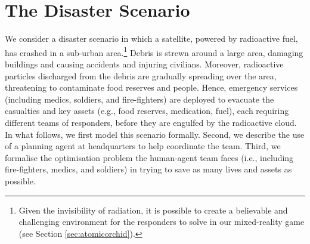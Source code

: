 \section{The Disaster Scenario}\label{sec:scenario}
\noindent We consider a disaster scenario in which a satellite, powered by radioactive fuel,  has crashed in a sub-urban area.\footnote{Given the invisibility of radiation, it is possible to create a believable and challenging environment for the responders to solve in our mixed-reality game (see Section \ref{sec:atomicorchid}).} Debris is strewn around a large area, damaging buildings and causing accidents and injuring civilians. Moreover, radioactive particles discharged from the debris are gradually spreading over the area, threatening to contaminate food reserves and people. Hence, emergency services (including medics, soldiers, and fire-fighters) are deployed to  evacuate the casualties and key assets (e.g., food reserves, medication, fuel), each requiring different teams of responders, before they are engulfed by the radioactive cloud.  In what follows, we first model this scenario formally. Second, we describe the use of a planning agent at headquarters to help coordinate the team. Third, we formalise  the optimisation problem the human-agent team faces (i.e., including fire-fighters, medics, and soldiers) in trying to save as many lives and assets as possible.  


